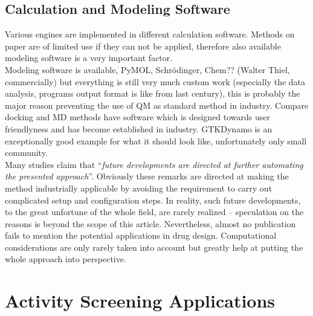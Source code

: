 \subsection{Calculation and Modeling Software}\label{sec:software}
Various engines are implemented in different calculation software.
Methods on paper are of limited use if they can not be applied, therefore also available modeling software is a very important factor.\\
Modeling software is available, PyMOL, Schr\"odinger, Chem?? (Walter Thiel, commercially) but everything is still very much custom work (especially the data analysis, programs output format is like from last century), this is probably the major reason preventing the use of QM as standard method in industry.
Compare docking and MD methods have software which is designed towards user friendlyness and has become established in industry.
GTKDynamo is an exceptionally good example for what it should look like, unfortunately only small community.\\
Many studies claim that ``\textit{future developments are directed at further automating the presented approach}''.
Obviously these remarks are directed at making the method industrially applicable by avoiding the requirement to carry out complicated setup and configuration steps\cite{rathore2013advances}.
In reality, such future developments, to the great unfortune of the whole field, are rarely realized -- speculation on the reasons is beyond the scope of this article.
Nevertheless, almost no publication fails to mention the potential applications in drug design.
Computational considerations are only rarely taken into account but greatly help at putting the whole approach into perspective\cite{buch2011complete}.


\section{Activity Screening Applications}\label{sec:apps}
